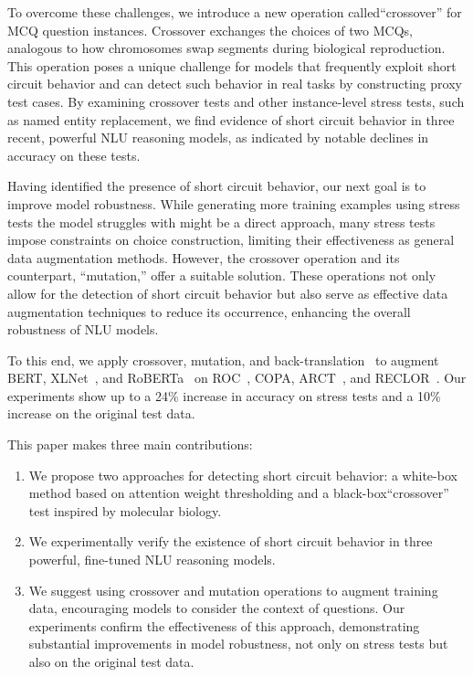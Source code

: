 To overcome these challenges, we introduce a new operation called``crossover'' for MCQ question instances. Crossover exchanges the choices of two MCQs, analogous to how chromosomes swap segments during biological reproduction. This operation poses a unique challenge for models that frequently exploit short circuit behavior and can detect such behavior in real tasks by constructing proxy test cases. By examining crossover tests and other instance-level stress tests, such as named entity replacement, we find evidence of short circuit behavior in three recent, powerful NLU reasoning models, as indicated by notable declines in accuracy on these tests.

Having identified the presence of short circuit behavior, our next goal is to improve model robustness. While generating more training examples using stress tests the model struggles with might be a direct approach, many stress tests impose constraints on choice construction, limiting their effectiveness as general data augmentation methods. However, the crossover operation and its counterpart, ``mutation,'' offer a suitable solution. These operations not only allow for the detection of short circuit behavior but also serve as effective data augmentation techniques to reduce its occurrence, enhancing the overall robustness of NLU models.

To this end, we apply
crossover, mutation, and back-translation~\cite{back2019} to augment BERT, XLNet~\cite{xlnet2019nips}, and RoBERTa~\cite{roberta2019} on ROC~\cite{roc2017}, COPA, ARCT~\cite{arct2018}, and RECLOR~\cite{yu2020reclor}. Our experiments show up to a 24\% increase in accuracy on stress tests and a 10\% increase on the original test data.

This paper makes three main contributions:

\begin{enumerate}
\item We propose two approaches for detecting short circuit behavior: a white-box method based on attention weight thresholding and a black-box``crossover'' test inspired by molecular biology.
\item We experimentally verify the existence of short circuit behavior in three powerful, fine-tuned NLU reasoning models.
\item We suggest using crossover and mutation operations to augment training data, encouraging models to consider the context of questions. Our experiments confirm the effectiveness of this approach, demonstrating substantial improvements in model robustness, not only on stress tests but also on the original test data.
\end{enumerate}
